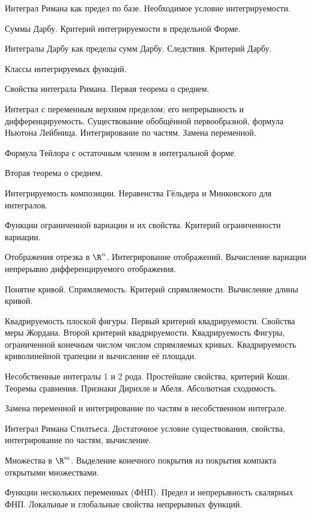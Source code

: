 \documentclass[a4paper]{article}
\begin{document}
\begin{nums}{-2}
\item Интеграл Римана как предел по базе. Необходимое условие интегрируемости.
\item Суммы Дарбу.  Критерий интегрируемости в предельной  Форме.
\item Интегралы Дарбу как пределы сумм Дарбу. Следствия. Критерий Дарбу.
\item Классы интегрируемых функций.
\item Свойства интеграла Римана. Первая теорема о среднем.
\item Интеграл с переменным верхним пределом; его непрерывность и дифференцируемость.
Существование обобщённой первообразной, формула Ньютона Лейбница. Интегрирование по частям. Замена
переменной.
\item Формула Тейлора с остаточным членом в интегральной форме.
\item Вторая теорема о среднем.
\item Интегрируемость композиции. Неравенства Гёльдера и Минковского для интегралов.
\item Функции ограниченной вариации и их свойства. Критерий ограниченности вариации.
\item Отображения отрезка в $\R^n$. Интегрирование отображений. Вычисление вариации
непрерывно дифференцируемого отображения.
\item Понятие кривой. Спрямляемость.  Критерий спрямляемости. Вычисление длины кривой.
\item Квадрируемость плоской фигуры. Первый критерий квадрируемости. Свойства меры Жордана.
Второй критерий квадрируемости. Квадрируемость Фигуры, ограниченной конечным числом числом спрямляемых кривых.
Квадрируемость криволинейной трапеции и вычисление её площади.
\item Несобственные интегралы 1 и 2 рода. Простейшие свойства, критерий Коши. Теоремы сравнения.
Признаки Дирихле и Абеля. Абсолютная сходимость.
\item Замена переменной и интегрирование по частям в несобственном интеграле.
\item Интеграл Римана Стилтьеса. Достаточное условие существования, свойства, интегрирование по частям, вычисление.
\item Множества в $\R^m$. Выделение конечного покрытия из покрытия компакта открытыми множествами.
\item Функции нескольких переменных (ФНП). Предел и непрерывность скалярных ФНП. Локальные и
глобальные свойства непрерывных функций.

\end{nums}
\end{document}
